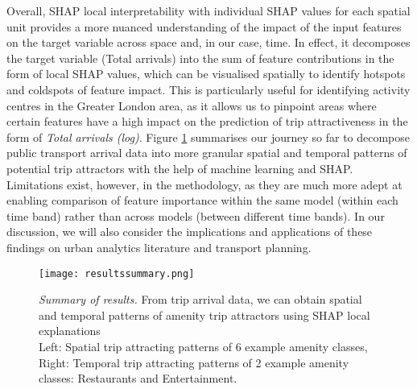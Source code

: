 Overall, SHAP local interpretability with individual SHAP values for each spatial unit provides a more nuanced understanding of the impact of the input features on the target variable across space and, in our case, time. In effect, it decomposes the target variable (Total arrivals) into the sum of feature contributions in the form of local SHAP values, which can be visualised spatially to identify hotspots and coldspots of feature impact. This is particularly useful for identifying activity centres in the Greater London area, as it allows us to pinpoint areas where certain features have a high impact on the prediction of trip attractiveness in the form of \textit{Total arrivals (log)}. Figure \ref{fig:resultssummary} summarises our journey so far to decompose public transport arrival data into more granular spatial and temporal patterns of potential trip attractors with the help of machine learning and SHAP. Limitations exist, however, in the methodology, as they are much more adept at enabling comparison of feature importance within the same model (within each time band) rather than across models (between different time bands). In our discussion, we will also consider the implications and applications of these findings on urban analytics literature and transport planning.

\begin{figure}[!htb]
    \centering
    \texttt{[image: resultssummary.png]}
    \captionsetup{justification=centering}
    \caption{\textit{Summary of results.} From trip arrival data, we can obtain spatial and temporal patterns of amenity trip attractors using SHAP local explanations\\Left: Spatial trip attracting patterns of 6 example amenity classes, Right: Temporal trip attracting patterns of 2 example amenity classes: Restaurants and Entertainment.}
    \label{fig:resultssummary}
\end{figure}